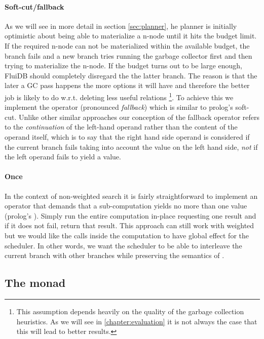 \paragraph{Soft-cut/fallback}
As we will see in more detail in section \ref{sec:planner}, he planner is
initially optimistic about being able to materialize a n-node until it
hits the budget limit. If the required n-node can not be materialized within the
available budget, the branch fails and a new branch tries running the
garbage collector first and then trying to materialize the n-node.  If
the budget turns out to be large enough, FluiDB should completely
disregard the the latter branch.  The reason is that the later a GC
pass happens the more options it will have and therefore the better
job is likely to do w.r.t. deleting less useful relations \footnote{This assumption depends heavily on the quality of the garbage collection heuristics. As we will see in \ref{chapter:evaluation} it is not always the case that this will lead to better results.}. To achieve
this we implement the operator \hask{<//>} (pronounced
\emph{fallback}) which is similar to prolog's soft-cut. Unlike other 
similar approaches our conception of the fallback
operator refers to the \emph{continuation} of the left-hand operand
rather than the content of the operand itself, which is to say that the right hand side operand 
is considered if the current branch fails taking into account 
the value on the left hand side, \emph{not} if the left operand fails
to yield a value.

\paragraph{Once}
In the context of non-weighted search it is fairly
straightforward to implement an operator that demands that a sub-computation yields no more than
one value (prolog's ). Simply run the entire computation
in-place requesting one result and if it does not fail, return that
result. This approach can still work with weighted but we would like
the  calls inside the computation to have global effect for the
scheduler. In other words, we want the scheduler to be able to
interleave the current branch with other branches while preserving the
semantics of .


\subsection{The  monad}
\label{sec:cntt_monad}

